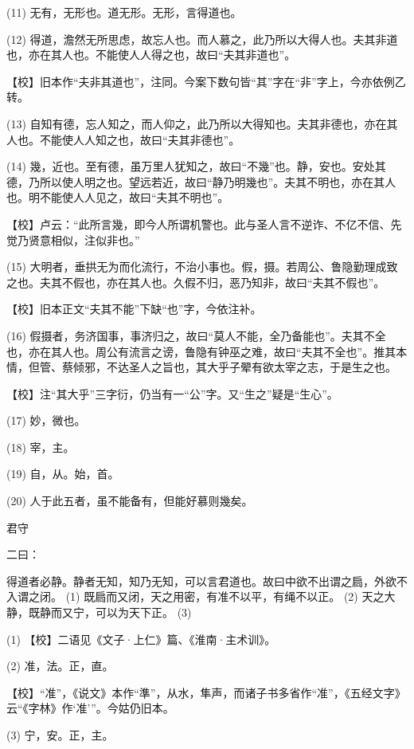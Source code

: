 \documentclass[12pt,UTF8]{ctexbook}
\begin{document}
(11) 无有，无形也。道无形。无形，言得道也。

(12) 得道，澹然无所思虑，故忘人也。而人慕之，此乃所以大得人也。夫其非道也，亦在其人也。不能使人人得之也，故曰“夫其非道也”。

【校】旧本作“夫非其道也”，注同。今案下数句皆“其”字在“非”字上，今亦依例乙转。

(13) 自知有德，忘人知之，而人仰之，此乃所以大得知也。夫其非德也，亦在其人也。不能使人人知之也，故曰“夫其非德也”。

(14) 幾，近也。至有德，虽万里人犹知之，故曰“不幾”也。静，安也。安处其德，乃所以使人明之也。望远若近，故曰“静乃明幾也”。夫其不明也，亦在其人也。明不能使人人见之，故曰“夫其不明也”。

【校】卢云：“此所言幾，即今人所谓机警也。此与圣人言不逆诈、不亿不信、先觉乃贤意相似，注似非也。”

(15) 大明者，垂拱无为而化流行，不治小事也。假，摄。若周公、鲁隐勤理成致之也。夫其不假也，亦在其人也。久假不归，恶乃知非，故曰“夫其不假也”。

【校】旧本正文“夫其不能”下缺“也”字，今依注补。

(16) 假摄者，务济国事，事济归之，故曰“莫人不能，全乃备能也”。夫其不全也，亦在其人也。周公有流言之谤，鲁隐有钟巫之难，故曰“夫其不全也”。推其本情，但管、蔡倾邪，不达圣人之旨也，其大乎子翚有欲太宰之志，于是生之也。

【校】注“其大乎”三字衍，仍当有一“公”字。又“生之”疑是“生心”。

(17) 妙，微也。

(18) 宰，主。

(19) 自，从。始，首。

(20) 人于此五者，虽不能备有，但能好慕则幾矣。





君守


二曰：

得道者必静。静者无知，知乃无知，可以言君道也。故曰中欲不出谓之扃，外欲不入谓之闭。 (1) 既扃而又闭，天之用密，有准不以平，有绳不以正。 (2) 天之大静，既静而又宁，可以为天下正。 (3)

(1) 【校】二语见《文子·上仁》篇、《淮南·主术训》。

(2) 准，法。正，直。

【校】“准”，《说文》本作“準”，从水，隼声，而诸子书多省作“准”，《五经文字》云“《字林》作‘准’”。今姑仍旧本。

(3) 宁，安。正，主。
\end{document}
